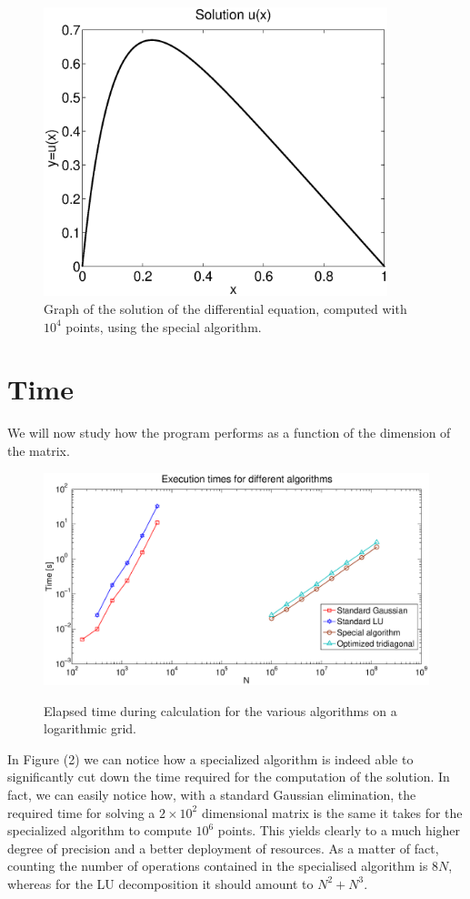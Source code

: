 \documentclass {article}
\begin{document}
\begin{figure}[H]
	\centering
	\includegraphics[width=10cm]{solution}
	\caption{Graph of the solution of the differential equation, computed with $10^4$ points, using the special algorithm.}
	\label{fig:solution}
\end{figure} 

\section{Time}

We will now study how the program performs as a function of the dimension of the matrix. 

\begin{figure}[ht]
 \centering
   {\includegraphics[width=18cm]{times.eps}}
 \caption{Elapsed time during calculation for the various algorithms on a logarithmic grid.}
\end{figure}

In Figure (2) we can notice how a specialized algorithm is indeed able to significantly cut down the time required for the computation of the solution.
In fact, we can easily notice how, with a standard Gaussian elimination, the required time for solving a $2 \times 10^2$  dimensional matrix is the same it takes for the specialized algorithm to compute $10^6$ points. This yields clearly to a much higher degree of precision and a better deployment of resources.
As a matter of fact, counting the number of operations contained in the specialised algorithm is $8N$, whereas for the LU decomposition it should amount to $N^2+N^3$. 
\end{document}
